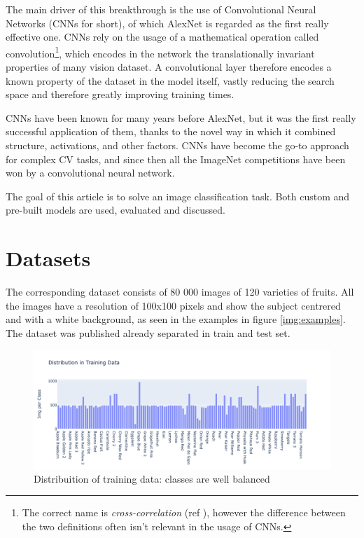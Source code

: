The main driver of this breakthrough is the use of Convolutional Neural Networks (CNNs for short), of which AlexNet is regarded as the first really effective one. CNNs rely on the usage of a mathematical operation called convolution\footnote{The correct name is \textit{cross-correlation} (ref \cite[[Chapter~9]{DeepLearningBook}), however the difference between the two definitions often isn't relevant in the usage of CNNs.}, which encodes in the network the translationally invariant properties of many vision dataset. A convolutional layer therefore encodes a known property of the dataset in the model itself, vastly reducing the search space and therefore greatly improving training times.

CNNs have been known for many years before AlexNet, but it was the first really successful application of them, thanks to the novel way in which it combined structure, activations, and other factors. CNNs have become the go-to approach for complex CV tasks, and since then all the ImageNet competitions have been won by a convolutional neural network.

The goal of this article is to solve an image classification task. Both custom and pre-built models are used, evaluated and discussed. 


\section{Datasets}
The corresponding dataset consists of 80 000 images of 120 varieties of fruits. All the images have a resolution of 100x100 pixels and show the subject centrered and with a white background, as seen in the examples in figure \ref{img:examples}. The dataset was published already separated in train and test set.

\begin{figure}[H]
	\centering
	\includegraphics[width=\textwidth]{Distribution.png}
	\caption{Distribuition of training data: classes are well balanced}
	\label{img:tdd}
\end{figure}

